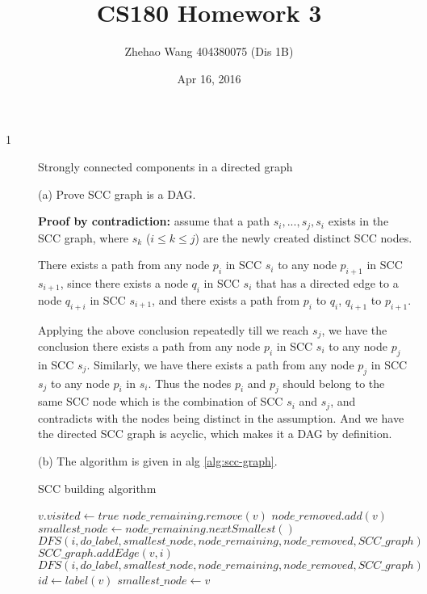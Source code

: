 \documentclass{article}
\title{CS180 Homework 3}
\author{Zhehao Wang 404380075 (Dis 1B)}
\date{Apr 16, 2016}
\begin{document}
\maketitle

\begin{description}

\item[1]{Strongly connected components in a directed graph}
  
  (a) Prove SCC graph is a DAG.

  \textbf{Proof by contradiction:} assume that a path $s_i, ..., s_j, s_i$ exists in the SCC graph, where $s_k$ ($i \leq k \leq j$) are the newly created distinct SCC nodes.

  There exists a path from any node $p_i$ in SCC $s_i$ to any node $p_{i+1}$ in SCC $s_{i+1}$, since there exists a node $q_i$ in SCC $s_i$ that has a directed edge to a node $q_{i+i}$ in SCC $s_{i+1}$, and there exists a path from $p_i$ to $q_i$, $q_{i+1}$ to $p_{i+1}$.

  Applying the above conclusion repeatedly till we reach $s_j$, we have the conclusion there exists a path from any node $p_i$ in SCC $s_i$ to any node $p_j$ in SCC $s_j$. Similarly, we have there exists a path from any node $p_j$ in SCC $s_j$ to any node $p_i$ in $s_i$. Thus the nodes $p_i$ and $p_j$ should belong to the same SCC node which is the combination of SCC $s_i$ and $s_j$, and contradicts with the nodes being distinct in the assumption. And we have the directed SCC graph is acyclic, which makes it a DAG by definition.

  (b) The algorithm is given in alg \ref{alg:scc-graph}.

  \begin{algorithm}[h]
  \caption{SCC building algorithm}
  \label{alg:scc-graph}
    \begin{algorithmic}[1]
  
      \State $v.visited \gets true$
        \State $node\_remaining.remove(v)$
        \State $node\_removed.add(v)$
          \State $smallest\_node \gets node\_remaining.nextSmallest()$
        \EndIf
      \EndIf
          \State $DFS(i, do\_label, smallest\_node, node\_remaining, node\_removed, SCC\_graph)$
        \Else
            \State $SCC\_graph.addEdge(v,i)$
          \Else
            \State $DFS(i, do\_label, smallest\_node, node\_remaining, node\_removed, SCC\_graph)$
          \EndIf
        \EndIf
      \EndFor
        \State $id \gets label(v)$
          \State $smallest\_node \gets v$
        \EndIf
      \EndIf
    \EndFunction


\end{algorithmic}
\end{algorithm}
\end{description}
\end{document}
